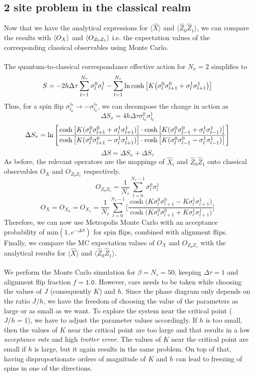 \documentclass[../thesis_main.tex]{subfiles}
\begin{document}
\subsection{2 site problem in the classical realm}
Now that we have the analytical expressions for $\langle \hat{X} \rangle$ and $\langle \hat{Z}_0 \hat{Z}_1 \rangle$, we can compare the results with $\expval{O_{X}}$ and $\expval{O_{Z_0 Z_1}}$ i.e. the expectation values of the corresponding classical observables using Monte Carlo.~\\~\\
The quantum-to-classical correspondance effective action for $N_x = 2$ simplifies to 
\[
    S = - 2h \Delta \tau \sum_{l=1}^{N_\tau} \sigma^{0}_l \sigma^{1}_{l} - \sum_{l=1}^{N_\tau} \ln \cosh \qty[K \qty(\sigma^0_l \sigma^0_{l+1} + \sigma^1_l \sigma^1_{l+1})] 
\]  
Thus, for a spin flip $\sigma^{i_0}_{l_0} \to - \sigma^{i_0}_{l_0}$, we can decompose the change in action as 
\[
    \Delta S_x = 4 h \Delta \tau \sigma^{0}_{l_0} \sigma^{1}_{l_0}  
\]
\[
    \Delta S_\tau = \ln \qty[ \frac{\cosh\qty[K(\sigma^{0}_{l} \sigma^{0}_{l+1} + \sigma^{1}_{l} \sigma^{1}_{l+1} )] \cdot \cosh\qty[K(\sigma^{0}_{l} \sigma^{0}_{l-1} + \sigma^{1}_{l} \sigma^{1}_{l-1} )] }{\cosh\qty[K(\sigma^{0}_{l} \sigma^{0}_{l+1} - \sigma^{1}_{l} \sigma^{1}_{l+1} )] \cdot \cosh\qty[K(\sigma^{0}_{l} \sigma^{0}_{l-1} - \sigma^{1}_{l} \sigma^{1}_{l-1} )]}  ]
\]
\[
    \Delta S = \Delta S_x + \Delta S_\tau 
\]
As before, the relevant operators are the mappings of $\hat{X}_i$ and $\hat{Z}_0 \hat{Z}_1$ onto classical observables $O_{X}$ and $O_{Z_0 Z_1}$ respectively.
\[
    O_{Z_0 Z_1} = \frac{1}{N_\tau} \sum_{l=0}^{N_\tau - 1} \sigma^0_l \sigma^1_l
\]
\[
    O_X = O_{X_0} = O_{X_1} = \frac{1}{N_\tau} \sum_{l=0}^{N_\tau -1} \Bigg[\frac{\cosh\big( K \sigma^0_l \sigma^0_{l+1} - K \sigma^1_l \sigma^1_{l+1} \big)}{\cosh\big( K \sigma^0_l \sigma^0_{l+1} + K \sigma^1_l \sigma^1_{l+1} \big)}  \Bigg]
\]
Therefore, we can now use Metropolis Monte Carlo with an acceptance probability of $\text{min} (1, e^{-\Delta S})$ for spin flips, combined with alignment flips. Finally, we compare the MC expectation values of $O_X$ and $O_{Z_0 Z_1}$ with the analytical results for $\langle \hat{X} \rangle$ and $\langle \hat{Z}_0 \hat{Z}_1\rangle$.~\\~\\
We perform the Monte Carlo simulation for $\beta = N_\tau = 50$, keeping $\Delta \tau = 1$ and alignment flip fraction $f = \texttt{1.0}$. However, care needs to be taken while choosing the values of $J$ (consequently $K$) and $h$. Since the phase diagram only depends on the ratio $J/h$, we have the freedom of choosing the value of the parameters as large or as small as we want. To explore the system near the critical point ($J/h = 1$), we have to adjust the parameter values accordingly. If $h$ is too small, then the values of $K$ near the critical point are too large and that results in a low \textit{acceptance rate} and high \textit{trotter error}. The values of $K$ near the critical point are small if $h$ is large, but it again results in the same problem. On top of that, having disproportionate orders of magnitude of $K$ and $h$ can lead to freezing of spins in one of the directions.~\\~\\
\end{document}

